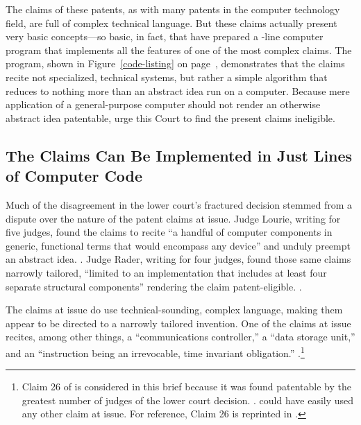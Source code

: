 \documentclass{scotus}
\begin{document}
The claims of these patents, as with many patents in the computer technology
field, are full of complex technical language.
But these claims actually present very basic concepts---so basic, in fact, that
\amici have prepared a \numlines-line computer program
that implements all the features of one of the most complex claims. The program,
shown in Figure~\ref{code-listing} on page~\pageref{code-listing},
demonstrates that the claims recite not specialized, technical systems, but
rather a simple algorithm that reduces to nothing more than an
abstract idea run on a computer. Because mere application of a general-purpose
computer should not render an otherwise abstract idea patentable, \amici
urge this Court to find the present claims ineligible.



%
%
\subsection{The Claims Can Be Implemented in Just \Numlines Lines of
Computer Code}

Much of the disagreement in the lower court's fractured decision stemmed
from a dispute over the nature of the patent claims at issue. Judge Lourie,
writing for five judges,
found the claims to recite ``a handful of
computer components in generic, functional terms that would encompass any
device'' and unduly preempt an abstract idea. .
Judge Rader, writing for four judges, found those same claims narrowly tailored,
``limited to an implementation that includes at least four separate structural
components'' rendering the claim patent-eligible. .

The claims at issue do use technical-sounding, complex language, making them
appear to be directed to a narrowly tailored invention. One of the claims at
issue recites, among other things, a ``communications controller,'' a
``data storage unit,'' and an ``instruction being an irrevocable, time invariant
obligation.'' .\footnote{Claim 26 of
 is considered in this brief because it was found patentable by
the greatest number of judges of the lower court decision. .
\Amici could have easily used any other claim at issue.
For reference, Claim
26 is reprinted in .}
\end{document}
